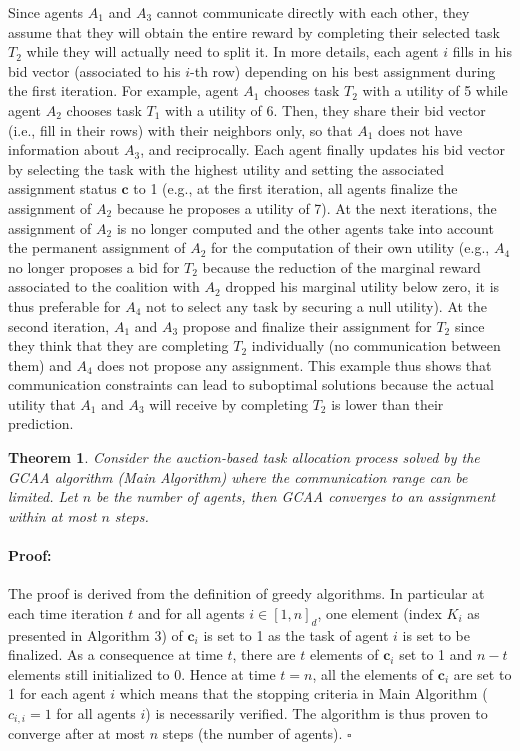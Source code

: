 \documentclass{ifacconf}
\newenvironment{proof}{\paragraph*{Proof:}}{\hfill$\square$}
\newtheorem{theorem}{Theorem}
\begin{document}
Since agents $A_1$ and $A_3$ cannot communicate directly with each other, they assume that they will obtain the entire reward by completing their selected task $T_2$ while they will actually need to split it. In more details, each agent $i$ fills in his bid vector (associated to his $i$-th row) depending on his best assignment during the first iteration. For example, agent $A_1$ chooses task $T_2$ with a utility of 5 while agent $A_2$ chooses task $T_1$ with a utility of 6. Then, they share their bid vector (i.e., fill in their rows) with their neighbors only, so that $A_1$ does not have information about $A_3$, and reciprocally. Each agent finally updates his bid vector by selecting the task with the highest utility and setting the associated assignment status $\bm{c}$ to 1 (e.g., at the first iteration, all agents finalize the assignment of $A_2$ because he proposes a utility of 7). At the next iterations, the assignment of $A_2$ is no longer computed and the other agents take into account the permanent assignment of $A_2$ for the computation of their own utility (e.g., $A_4$ no longer proposes a bid for $T_2$ because the reduction of the marginal reward associated to the coalition with $A_2$ dropped his marginal utility below zero, it is thus preferable for $A_4$ not to select any task by securing a null utility). At the second iteration, $A_1$ and $A_3$ propose and finalize their assignment for $T_2$ since they think that they are completing $T_2$ individually (no communication between them) and $A_4$ does not propose any assignment. This example thus shows that communication constraints can lead to suboptimal solutions because the actual utility that $A_1$ and $A_3$ will receive by completing $T_2$ is lower than their prediction.

\begin{theorem}
Consider the auction-based task allocation process solved by the GCAA algorithm (Main Algorithm) where the communication range can be limited. Let $n$ be the number of agents, then GCAA converges to an assignment within at most $n$ steps.
\end{theorem}
\begin{proof}
The proof is derived from the definition of greedy algorithms. In particular at each time iteration $t$ and for all agents $i \in [1,n]_d$, one element (index $K_i$ as presented in Algorithm 3) of $\bm{c}_{i}$ is set to 1 as the task of agent $i$ is set to be finalized. As a consequence at time $t$, there are $t$ elements of $\bm{c}_{i}$ set to 1 and $n-t$ elements still initialized to 0. Hence at time $t=n$, all the elements of $\bm{c}_{i}$ are set to 1 for each agent $i$ which means that the stopping criteria in Main Algorithm ($c_{i,i} = 1$ for all agents $i$) is necessarily verified. The algorithm is thus proven to converge after at most $n$ steps (the number of agents).
\end{proof}
\end{document}
